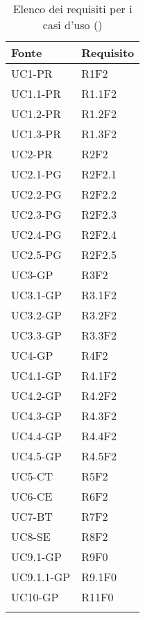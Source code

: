 		\setcounter{tableCounter}{1}
		\begin{table}[H]
			\centering
			{\def\arraystretch{1.5}
			\begin{tabularx}{0.7\textwidth}{YY}
				\textbf{Fonte} & \textbf{Requisito} \\
				\toprule
				UC1-PR & R1F2 \\
                UC1.1-PR & R1.1F2\\
                UC1.2-PR & R1.2F2\\
                UC1.3-PR & R1.3F2\\
				UC2-PR & R2F2 \\
                UC2.1-PG & R2F2.1 \\
                UC2.2-PG & R2F2.2 \\
                UC2.3-PG & R2F2.3 \\
                UC2.4-PG & R2F2.4 \\
                UC2.5-PG & R2F2.5 \\
				UC3-GP & R3F2 \\
                UC3.1-GP & R3.1F2 \\
                UC3.2-GP & R3.2F2 \\
                UC3.3-GP & R3.3F2 \\
				UC4-GP & R4F2 \\
                UC4.1-GP & R4.1F2 \\
                UC4.2-GP & R4.2F2 \\
                UC4.3-GP & R4.3F2 \\
                UC4.4-GP & R4.4F2 \\
                UC4.5-GP & R4.5F2 \\
				UC5-CT & R5F2 \\
				UC6-CE & R6F2 \\
				UC7-BT & R7F2 \\
				UC8-SE & R8F2 \\
				UC9.1-GP & R9F0 \\
                UC9.1.1-GP & R9.1F0 \\
                UC10-GP & R11F0 \\
				\bottomrule \\
			\end{tabularx}}
			\caption{Elenco dei requisiti per i casi d'uso (\thetableCounter)}
		\end{table}


